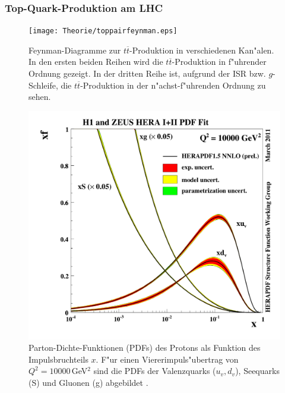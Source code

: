 \subsubsection{Top-Quark-Produktion am LHC}
\begin{figure}[t]
	\centering
	\texttt{[image: Theorie/toppairfeynman.eps]}
	\caption[Feynman-Diagramme zur $t\overline{t}$-Produktion in verschiedenen Kan"alen]{Feynman-Diagramme zur $t\overline{t}$-Produktion in verschiedenen Kan"alen. In den ersten beiden Reihen wird die $t\overline{t}$-Produktion in f"uhrender Ordnung gezeigt. In der dritten Reihe ist, aufgrund der ISR bzw. $g$-Schleife, die $t\overline{t}$-Produktion in der n"achst-f"uhrenden Ordnung zu sehen.}
	\label{toppairproduction}
\end{figure}
\begin{figure}[t!]
	\centering
	\includegraphics[scale=0.30]{Theorie/herapdf2.png}
	\caption[Parton-Dichte-Funktionen (PDFs) des Protons als Funktion des Impulsbruchteils $x$]{Parton-Dichte-Funktionen (PDFs) des Protons als Funktion des Impulsbruchteils $x$. F"ur einen Viererimpuls"ubertrag von $Q^{2}=10000$\,GeV$^{2}$ sind die PDFs der Valenzquarks ($u_{v},d_{v}$), Seequarks (S) und Gluonen (g) abgebildet \cite{combinedhera}.}
	\label{herannlo}
\end{figure}
